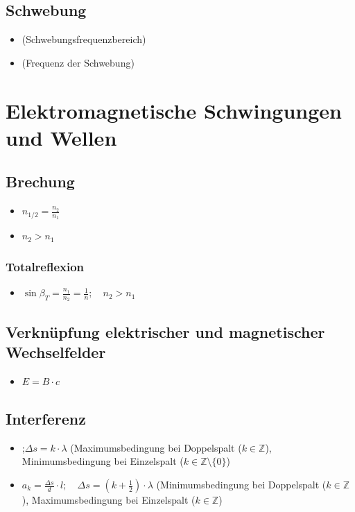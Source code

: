 \documentclass[paper = a4, twocolumn]{scrartcl}
\begin{document}
\subsection{Schwebung}
\begin{itemize}
\item
	 (Schwebungsfrequenzbereich)
\item
	 (Frequenz der Schwebung)
\end{itemize}

\section{Elektromagnetische Schwingungen und Wellen}
\subsection{Brechung}
\begin{itemize}
\item
	\( n_{1/2} = \frac{n_2}{n_1} \)
\item
	\( n_2 > n_1 \)
\end{itemize}

\subsubsection{Totalreflexion}
\begin{itemize}
\item
	\( \sin \beta_T = \frac{n_1}{n_2} = \frac{1}{n}; \quad n_2 > n_1 \)
\end{itemize}

\subsection{Verknüpfung elektrischer und magnetischer Wechselfelder}
\begin{itemize}
\item
	\( E = B \cdot c \)
\end{itemize}

\subsection{Interferenz}
\begin{itemize}
\item
	;\quad\( \Delta s = k \cdot
	\lambda \) (Maximumsbedingung bei Doppelspalt (\( k \in \mathbb{Z} \)),
	Minimumsbedingung bei Einzelspalt (\( k \in \mathbb{Z}\setminus\{0\} \))
\item
	\( a_k = \frac{\Delta s}{d} \cdot l; \quad \Delta s = (k + \frac{1}{2})
	\cdot \lambda \) (Minimumsbedingung bei Doppelspalt (\( k \in
	\mathbb{Z} \)), Maximumsbedingung bei Einzelspalt (\( k
	\in \mathbb{Z} \))
\end{itemize}
\end{document}
